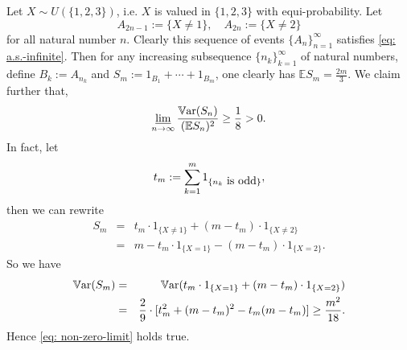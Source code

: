 \documentclass{article}
\numberwithin{equation}{section}
\newcommand{\Var}{{\mathbb{V}}{\rm ar}}
\newcommand{\Enum}{\mathbb{E}}
\begin{document}
Let $X \sim U(\{1,2,3\})$, i.e. $X$ is valued in $\{1,2,3\}$ with equi-probability. Let
$$
A_{2n-1} :=\{X \neq 1\}, \quad A_{2n} :=\{X \neq 2\}
$$
for all natural number $n$. Clearly this sequence of events $\{A_n\}_{n=1}^\infty$ satisfies \eqref{eq: a.s.-infinite}. Then for any increasing subsequence $\{n_k\}_{k=1}
^\infty$ of natural numbers, define $B_k :=A_{n_k}$ and $S_m:=1_{B_1}+\cdots +1_{B_m}$, one clearly has $\Enum S_m=\frac{2m}{3}$. We claim further that,
\begin{equation}\label{eq: non-zero-limit}
\varliminf_{n \to \infty} \frac{\Var (S_n)}{(\Enum S_n)^2} \geq \frac{1}{8}>0.
\end{equation}
In fact, let
$$
t_m:=\sum_{k=1}^m 1_{\{n_k \hbox{ is odd}\}},
$$
then we can rewrite
\begin{eqnarray*}
S_m &=& t_m \cdot 1_{\{X \neq 1\}} +(m-t_m) \cdot 1_{\{X \neq 2\}}\\
&=& m-t_m \cdot 1_{\{X = 1\}} -(m-t_m) \cdot  1_{\{X = 2\}}.
\end{eqnarray*}
So we have
\begin{eqnarray*}
\Var (S_m) &=& \Var (t_m \cdot 1_{\{X = 1\}} +(m-t_m) \cdot  1_{\{X = 2\}})\\
&=& \frac{2}{9} \cdot [t_m^2+(m-t_m)^2 -t_m (m-t_m)] \geq \frac{m^2}{18}.
\end{eqnarray*}
Hence \eqref{eq: non-zero-limit} holds true.
\end{document}
